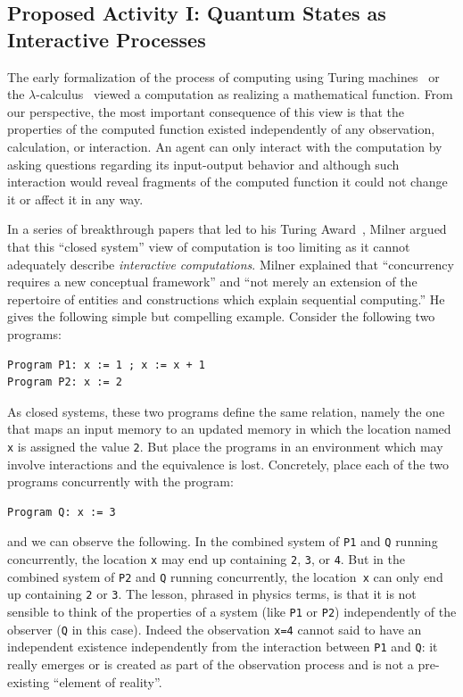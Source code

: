 \documentclass{article}
\theoremstyle{remark}
\begin{document}
\subsection{Proposed Activity I: Quantum States as Interactive Processes} 

The early formalization of the process of computing using Turing
machines~\cite{citeulike:321509} or the
$\lambda$-calculus~\cite{Barendregt:Lambda} viewed a computation as
realizing a mathematical function. From our perspective, the most
important consequence of this view is that the properties of the
computed function existed independently of any observation,
calculation, or interaction. An agent can only interact with the
computation by asking questions regarding its input-output behavior
and although such interaction would reveal fragments of the computed
function it could not change it or affect it in any way.

In a series of breakthrough papers that led to his Turing
Award~\cite{Milner:1993:EIT:151233.151240}, Milner argued that this
``closed system'' view of computation is too limiting as it cannot
adequately describe \emph{interactive computations}. Milner explained
that ``concurrency requires a new conceptual framework'' and ``not
merely an extension of the repertoire of entities and constructions
which explain sequential computing.'' He gives the following simple
but compelling example. Consider the following two programs:
\begin{verbatim}
Program P1: x := 1 ; x := x + 1 
Program P2: x := 2
\end{verbatim}
As closed systems, these two programs define the same relation, namely
the one that maps an input memory to an updated memory in which the
location named \verb|x| is assigned the value \verb|2|. But place the
programs in an environment which may involve interactions and the
equivalence is lost. Concretely, place each of the two programs
concurrently with the program:
\begin{verbatim}
Program Q: x := 3
\end{verbatim}
and we can observe the following. In the combined system of \verb|P1|
and \verb|Q| running concurrently, the location \verb|x| may end up
containing \verb|2|, \verb|3|, or \verb|4|. But in the combined system
of \verb|P2| and \verb|Q| running concurrently, the location~\verb|x|
can only end up containing \verb|2| or \verb|3|. The lesson, phrased
in physics terms, is that it is not sensible to think of the properties
of a system (like \verb|P1| or \verb|P2|) independently of the
observer (\verb|Q| in this case). Indeed the observation \verb|x=4|
cannot said to have an independent existence independently from the
interaction between \verb|P1| and \verb|Q|: it really emerges or is
created as part of the observation process and is not a pre-existing
``element of reality''.
\end{document}
